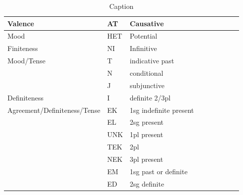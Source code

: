 \documentclass[11pt,letterpaper]{article}
\begin{document}
\begin{table}
    \centering
    \begin{tabular}{lllllllll}
Valence	    & AT & Causative \\ \hline
Mood	    & HET & Potential \\\hline
Finiteness  & NI & Infinitive \\\hline
Mood/Tense& T & indicative past \\
         & N & conditional \\
         & J & subjunctive \\
         \hline
Definiteness & I & definite 2/3pl \\
         \hline
Agreement/Definiteness/Tense         & EK & 1sg indefinite present\\
         & EL & 2sg present\\
         & UNK & 1pl present\\
         & TEK & 2pl\\
         & NEK & 3pl present\\
         & EM & 1sg past or definite \\
         & ED & 2sg definite \\
    \end{tabular}
    \caption{Caption}
    \label{tab:my_label}
\end{table}
\end{document}
